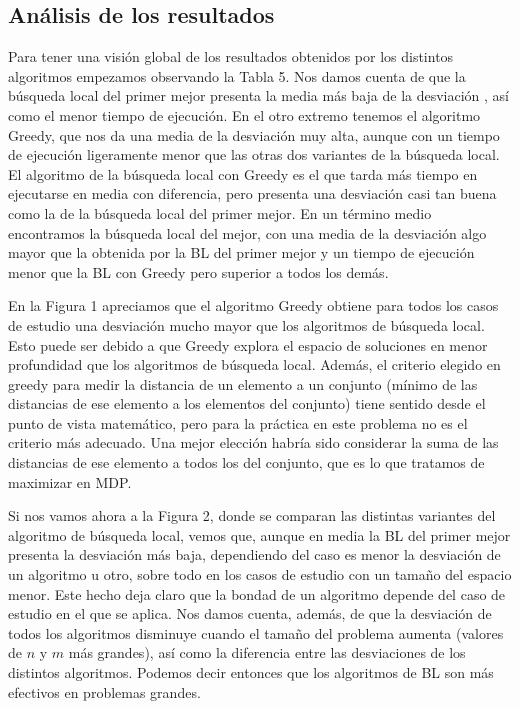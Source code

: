 \documentclass[11pt,a4paper]{article}
\begin{document}
	\subsection{ Análisis de los resultados }
	
	Para tener una visión global de los resultados obtenidos por los distintos algoritmos empezamos observando la Tabla 5. Nos damos cuenta de que la búsqueda local del primer mejor presenta la media más baja de la desviación , así como el menor tiempo de ejecución. En el otro extremo tenemos el algoritmo Greedy, que nos da una media de la desviación  muy alta, aunque con un tiempo de ejecución ligeramente menor que las otras dos variantes de la búsqueda local. El algoritmo de la búsqueda local con Greedy es el que tarda más tiempo en ejecutarse en media con diferencia, pero presenta una desviación  casi tan buena como la de la búsqueda local del primer mejor. En un término medio encontramos la búsqueda local del mejor, con una media de la desviación  algo mayor que la obtenida por la BL del primer mejor y un tiempo de ejecución menor que la BL con Greedy pero superior a todos los demás. 
	
	En la Figura 1 apreciamos que el algoritmo Greedy obtiene para todos los casos de estudio una desviación  mucho mayor que los algoritmos de búsqueda local. Esto puede ser debido a que Greedy explora el espacio de soluciones en menor profundidad que los algoritmos de búsqueda local. Además, el criterio elegido en greedy para medir la distancia de un elemento a un conjunto (mínimo de las distancias de ese elemento a los elementos del conjunto) tiene sentido desde el punto de vista matemático, pero para la práctica en este problema no es el criterio más adecuado. Una mejor elección habría sido considerar la suma de las distancias de ese elemento a todos los del conjunto, que es lo que tratamos de maximizar en MDP. 
	
	 Si nos vamos ahora a la Figura 2, donde se comparan las distintas variantes del algoritmo de búsqueda local, vemos que, aunque en media la BL del primer mejor presenta la desviación  más baja, dependiendo del caso es menor la desviación de un algoritmo u otro, sobre todo en los casos de estudio con un tamaño del espacio menor. Este hecho deja claro que la bondad de un algoritmo depende del caso de estudio en el que se aplica. Nos damos cuenta, además, de que la desviación de todos los algoritmos disminuye cuando el tamaño del problema aumenta (valores de $n$ y $m$ más grandes), así como la diferencia entre las desviaciones de los distintos algoritmos. Podemos decir entonces que los algoritmos de BL son más efectivos en problemas grandes. 
	 
\end{document}
